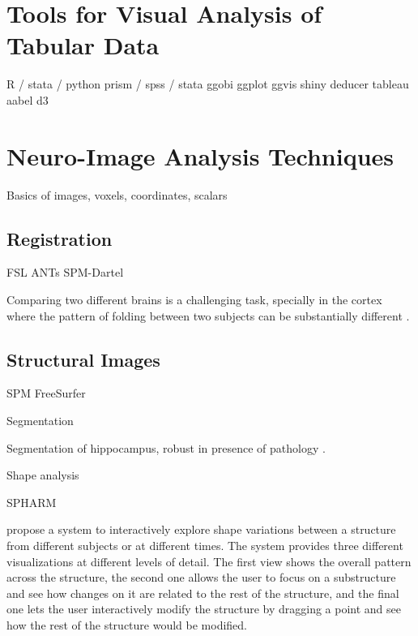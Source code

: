 \section{Tools for Visual Analysis of Tabular Data}

R  / stata  / python
prism / spss / stata
ggobi
ggplot \autocite{wickham_practical_2008}
ggvis
shiny
deducer
tableau
aabel
d3

\begin{table}
	\centering
		\begin{tabular}
			
		\end{tabular}
	\label{tab_related_tabular_applications}
\end{table}

\section{Neuro-Image Analysis Techniques}

Basics of images, voxels, coordinates, scalars


\subsection{Registration}

FSL
ANTs
SPM-Dartel


Comparing two different brains is a challenging task, specially in the cortex where the pattern of folding between two subjects can be substantially different \autocite{toga_new_2002}.

\subsection{Structural Images}

SPM
FreeSurfer

Segmentation

Segmentation of hippocampus, robust in presence of pathology \autocite{kim_robust_2011}.

Shape analysis

SPHARM

\autocite{hermann_visual_2014} propose a system to interactively explore shape variations between a structure from different subjects or at different times. The system provides three different visualizations at different levels of detail. The first view shows the overall pattern across the structure, the second one allows the user to focus on a substructure and see how changes on it are related to the rest of the structure, and the final one lets the user interactively modify the structure by dragging a  point and see how the rest of the structure would be modified. 

